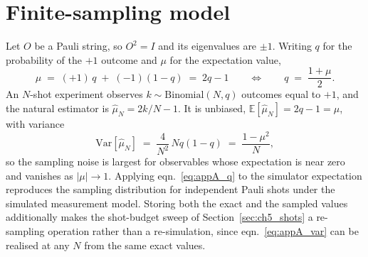 \section{Finite-sampling model}
\label{sec:appA_shots}

Let $O$ be a Pauli string, so $O^2 = I$ and its eigenvalues are $\pm 1$. Writing
$q$ for the probability of the $+1$ outcome and $\mu$ for the expectation value,
\begin{equation}
    \mu \;=\; (+1)\,q \;+\; (-1)(1-q) \;=\; 2q - 1
    \qquad \Longleftrightarrow \qquad
    q \;=\; \frac{1 + \mu}{2}.
    \label{eq:appA_q}
\end{equation}
An $N$-shot experiment observes $k \sim \mathrm{Binomial}(N, q)$ outcomes equal to
$+1$, and the natural estimator is $\widehat{\mu}_N = 2k/N - 1$. It is unbiased,
$\mathbb{E}[\widehat{\mu}_N] = 2q - 1 = \mu$, with variance
\begin{equation}
    \mathrm{Var}\!\left[ \widehat{\mu}_N \right]
    \;=\; \frac{4}{N^{2}} \, N q (1-q)
    \;=\; \frac{1 - \mu^{2}}{N},
    \label{eq:appA_var}
\end{equation}
so the sampling noise is largest for observables whose expectation is near zero and
vanishes as $|\mu| \to 1$. Applying eqn.~\eqref{eq:appA_q} to the simulator expectation reproduces the
sampling distribution for independent Pauli shots under the simulated measurement
model. Storing both the exact and the sampled values additionally makes the
shot-budget sweep of Section~\ref{sec:ch5_shots} a re-sampling operation rather than
a re-simulation, since eqn.~\eqref{eq:appA_var} can be realised at any $N$ from the
same exact values.

